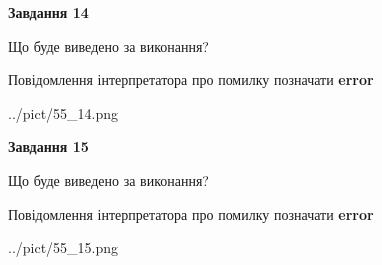 \documentclass[11pt, ukrainian]{article}
\begin{document}
{\begin {large}
{\begin {center}\textbf{Завдання 14}\end {center}}\par
Що буде виведено за виконання? \par
Повідомлення інтерпретатора про помилку позначати \textbf{error}

\begin{center}
	{../pict/55_14.png}
\end{center}
\newpage

{\begin {center}\textbf{Завдання 15}\end {center}}\par
Що буде виведено за виконання? \par
Повідомлення інтерпретатора про помилку позначати \textbf{error}

\begin{center}
	{../pict/55_15.png}
\end{center}
\newpage

\end {large}}
\end{document}
